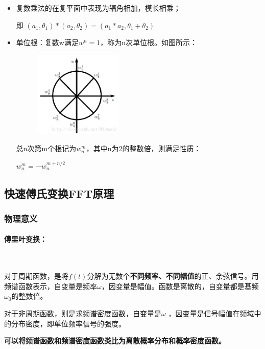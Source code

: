 \documentclass[UTF8]{article}%
\begin{document}
\begin{itemize}
    \item 复数乘法的在复平面中表现为辐角相加，模长相乘；
    
    即 $(a_1,\theta_1)*(a_2,\theta_2)=(a_1*a_2,\theta_1+\theta_2)$

    \item 单位根：复数w满足$w^n=1$，称为n次单位根。如图所示：
    
    {
        \begin{figure}[htb!]%
            \includegraphics[width=0.4\textwidth]{3-1.png}
        \end{figure}
    }
    
    总n次第m个根记为$w_n^m$，其中n为2的整数倍，则满足性质：

    $w_n^m=-w_n^{m+n/2}$

\end{itemize}

\subsection{快速傅氏变换FFT原理}

\subsubsection{物理意义}

\paragraph{傅里叶变换：}~{}

对于周期函数，是将$f(t)$分解为无数个\textbf{不同频率、不同幅值}的正、余弦信号。用频谱函数表示，自变量是频率$\omega $，因变量是幅值。函数是离散的，自变量都是基频$\omega_0$的整数倍。

对于非周期函数，则是求频谱密度函数，自变量是$\omega $ ，因变量是信号幅值在频域中的分布密度，即单位频率信号的强度。

\textbf{可以将频谱函数和频谱密度函数类比为离散概率分布和概率密度函数。}
\end{document}
